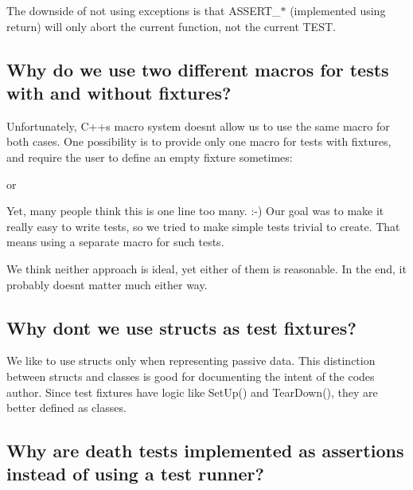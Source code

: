 The downside of not using exceptions is that {\ttfamily A\+S\+S\+E\+R\+T\+\_\+$\ast$} (implemented using {\ttfamily return}) will only abort the current function, not the current {\ttfamily T\+E\+ST}.

\subsection*{Why do we use two different macros for tests with and without fixtures?}

Unfortunately, C++\textquotesingle{}s macro system doesn\textquotesingle{}t allow us to use the same macro for both cases. One possibility is to provide only one macro for tests with fixtures, and require the user to define an empty fixture sometimes\+:


\begin{DoxyCode}{0}
\DoxyCodeLine{}
\end{DoxyCode}
 or 
\begin{DoxyCode}{0}
\DoxyCodeLine{}
\end{DoxyCode}


Yet, many people think this is one line too many. \+:-\/) Our goal was to make it really easy to write tests, so we tried to make simple tests trivial to create. That means using a separate macro for such tests.

We think neither approach is ideal, yet either of them is reasonable. In the end, it probably doesn\textquotesingle{}t matter much either way.

\subsection*{Why don\textquotesingle{}t we use structs as test fixtures?}

We like to use structs only when representing passive data. This distinction between structs and classes is good for documenting the intent of the code\textquotesingle{}s author. Since test fixtures have logic like {\ttfamily Set\+Up()} and {\ttfamily Tear\+Down()}, they are better defined as classes.

\subsection*{Why are death tests implemented as assertions instead of using a test runner?}

